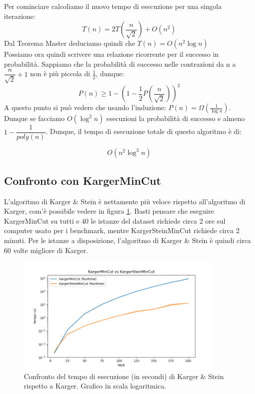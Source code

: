 Per cominciare calcoliamo il nuovo tempo di esecuzione per una singola iterazione:
$$T(n) = 2T(\dfrac{n}{\sqrt{2}}) + O(n^2) $$
Dal Teorema Master deduciamo quindi che $T(n) = O(n^2 \log{n})$\\

\noindent Possiamo ora quindi scrivere una relazione ricorrente per il successo in probabilità. Sappiamo che la probabilità di successo nelle contrazioni da n a $\dfrac{n}{\sqrt{2}} + 1$ non è più piccola di $\frac{1}{2}$, dunque:
$$P(n) \geq 1-(1- \frac{1}{2}P(\dfrac{n}{\sqrt{2}}))^2$$
A questo punto si può vedere che usando l'induzione: $P(n)= \Omega(\frac{1}{\log{n}}) $. Dunque se facciamo $O(\log^2{n})$ esecuzioni la probabilità di successo e almeno $1-\dfrac{1}{poly(n)}$. Dunque, il tempo di esecuzione totale di questo algoritmo è di:

$$O(n^2 \log^3{n})$$

\subsection{Confronto con KargerMinCut}

\noindent L'algoritmo di Karger \& Stein è nettamente più veloce rispetto all'algoritmo di Karger, com'è possibile vedere in figura \ref{fig:karger-vs-karger-stein}. Basti pensare che eseguire KargerMinCut su tutti e 40 le istanze del dataset richiede circa 2 ore sul computer usato per i benchmark, mentre KargerSteinMinCut richiede circa 2 minuti. Per le istanze a disposizione, l'algoritmo di Karger \& Stein è quindi circa 60 volte migliore di Karger.

\begin{figure}[H]
    \centering

    \includegraphics[width=0.9\textwidth]{./images/karger_vs_karger_stein - log.png}

    \caption{Confronto del tempo di esecuzione (in secondi) di Karger \& Stein rispetto a Karger. Grafico in scala logaritmica.}
    \label{fig:karger-vs-karger-stein}
\end{figure}

